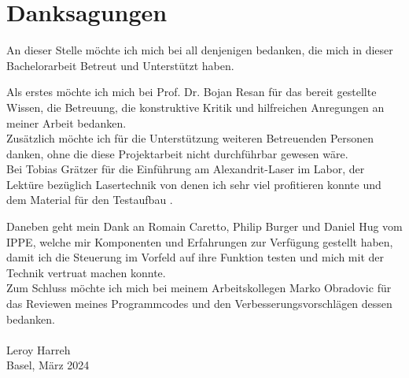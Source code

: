 \section*{Danksagungen}
An dieser Stelle möchte ich mich bei all denjenigen bedanken, die mich in dieser Bachelorarbeit Betreut und Unterstützt haben.

Als erstes möchte ich mich bei Prof. Dr. Bojan Resan für das bereit gestellte Wissen, die Betreuung, die konstruktive Kritik und hilfreichen Anregungen an meiner Arbeit bedanken.\\

Zusätzlich möchte ich für die Unterstützung weiteren Betreuenden Personen danken, ohne die diese Projektarbeit nicht durchführbar gewesen wäre.\\ Bei Tobias Grätzer für die Einführung am Alexandrit-Laser im Labor, der Lektüre bezüglich Lasertechnik von denen ich sehr viel profitieren konnte und dem Material für den Testaufbau .

Daneben geht mein Dank an Romain Caretto, Philip Burger und Daniel Hug vom IPPE, welche mir Komponenten und Erfahrungen zur Verfügung gestellt haben, damit ich die Steuerung im Vorfeld auf ihre Funktion testen und mich mit der Technik vertruat machen konnte.\\

Zum Schluss möchte ich mich bei meinem Arbeitskollegen Marko Obradovic für das Reviewen meines Programmcodes und den Verbesserungsvorschlägen dessen bedanken.
\\\\
Leroy Harreh\\
Basel, März 2024